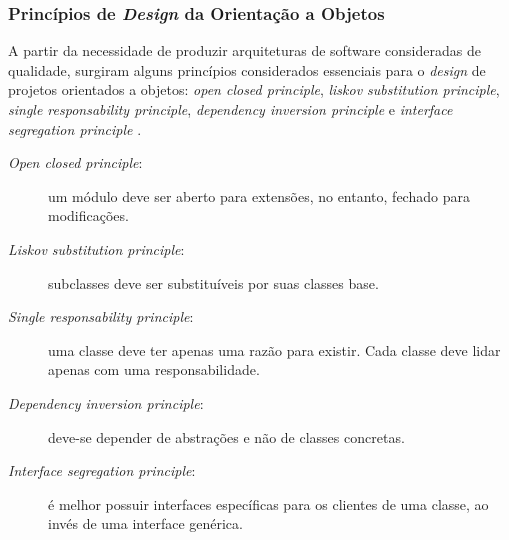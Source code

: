 \subsubsection{Princípios de \textit{Design} da Orientação a Objetos}
A partir da necessidade de produzir arquiteturas de software consideradas de qualidade, surgiram alguns princípios considerados essenciais para o \textit{design} de projetos orientados a objetos: \textit{open closed principle}, \textit{liskov substitution principle}, \textit{single responsability principle}, \textit{dependency inversion principle} e \textit{interface segregation principle} \cite{martin2000}.
\begin{description}
\item[\textit{Open closed principle}:] um módulo deve ser aberto para extensões, no entanto, fechado para modificações.
\item[\textit{Liskov substitution principle}:] subclasses deve ser substituíveis por suas classes base.
\item[\textit{Single responsability principle}:] uma classe deve ter apenas uma razão para existir. Cada classe deve lidar apenas com uma responsabilidade.
\item[\textit{Dependency inversion principle}:] deve-se depender de abstrações e não de classes concretas.
\item[\textit{Interface segregation principle}:] é melhor possuir interfaces específicas para os clientes de uma classe, ao invés de uma interface genérica.
\end{description}
\par
